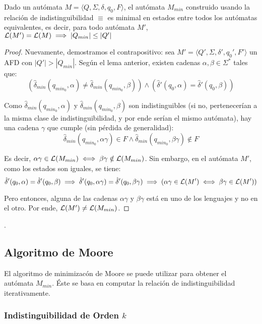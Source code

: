 \begin{theorem*}
    Dado un autómata $M = \langle Q, \Sigma, \delta, q_0, F \rangle$, el autómata $M_{min}$ construido usando la relación de indistinguibilidad $\equiv$ es minimal en estados entre todos los autómatas equivalentes, es decir, para todo autómata $M'$, $\mathcal{L}(M') = \mathcal{L}(M) \implies |Q_{min}| \leq |Q'|$
\end{theorem*}
\begin{proof}
    Nuevamente, demostramos el contrapositivo: sea $M'= \langle Q', \Sigma, \delta', q_0', F' \rangle$ un AFD con $|Q'| > |Q_{min}|$. Según el lema anterior, existen cadenas $\alpha, \beta \in \Sigma^*$ tales que:
    $$
        (\hat\delta_{min}(q_{min_0}, \alpha) \neq \hat\delta_{min}(q_{min_0}, \beta)) \land (\hat\delta'(q_0, \alpha) = \hat\delta'(q_0, \beta))
    $$

    Como $\hat\delta_{min}(q_{min_0}, \alpha)$ y $\hat\delta_{min}(q_{min_0}, \beta)$ son indistinguibles (si no, pertenecerían a la misma clase de indistinguibilidad, y por ende serían el mismo autómata), hay una cadena $\gamma$ que cumple (sin pérdida de generalidad):
    $$
        \hat\delta_{min}(q_{min_0}, \alpha\gamma) \in F \land \hat\delta_{min}(q_{min_0}, \beta\gamma) \notin F
    $$

    Es decir, $\alpha\gamma \in \mathcal{L}(M_{min}) \iff \beta\gamma \notin \mathcal{L}(M_{min})$. Sin embargo, en el autómata $M'$, como los estados son iguales, se tiene:
    $$
        \hat\delta'(q_0, \alpha) = \hat\delta'(q_0, \beta) \implies \hat\delta'(q_0, \alpha\gamma) = \hat\delta'(q_0, \beta\gamma) \implies (\alpha\gamma \in \mathcal{L}(M') \iff \beta\gamma \in \mathcal{L}(M'))
    $$

    Pero entonces, alguna de las cadenas $\alpha\gamma$ y $\beta\gamma$ está en uno de los lenguajes y no en el otro. Por ende, $\mathcal{L}(M') \neq \mathcal{L}(M_{min})$.
\end{proof}.

\subsection{Algoritmo de Moore}

El algoritmo de minimizacón de Moore se puede utilizar para obtener el autómata $M_{min}$. Éste se basa en computar la relación de indistinguibilidad iterativamente.

\subsubsection{Indistinguibilidad de Orden $k$}

